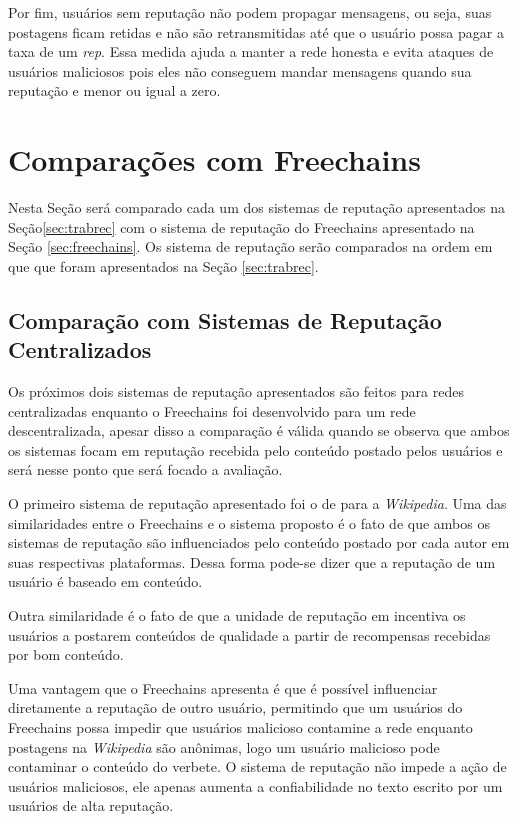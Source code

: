 \documentclass[12pt]{article}
\newcommand{\FC} {Freechains\xspace}
\begin{document}
Por fim, usuários sem reputação não podem propagar mensagens, ou seja, suas postagens ficam retidas e não são retransmitidas até que o usuário possa pagar a taxa de um \emph{rep}. Essa medida ajuda a manter a rede honesta e evita ataques de usuários maliciosos pois eles não conseguem mandar mensagens quando sua reputação e menor ou igual a zero.

\section{Comparações com \FC} \label{sec:comparacao}

Nesta Seção será comparado cada um dos sistemas de reputação apresentados na Seção\ref{sec:trabrec} com o sistema de reputação do \FC apresentado na Seção \ref{sec:freechains}. Os sistema de reputação serão comparados na ordem em que que foram apresentados na Seção \ref{sec:trabrec}.

\subsection{Comparação com Sistemas de Reputação Centralizados} \label{subsec:CompSRC}

Os próximos dois sistemas de reputação apresentados são feitos para redes centralizadas enquanto o \FC foi desenvolvido para um rede descentralizada, apesar disso a comparação é válida quando se observa que ambos os sistemas focam em reputação recebida pelo conteúdo postado pelos usuários e será nesse ponto que será focado a avaliação.

O primeiro sistema de reputação apresentado foi o de \cite{adler2007content} para a \emph{Wikipedia}. Uma das similaridades entre o \FC e o sistema proposto é o fato de que ambos os sistemas de reputação são influenciados pelo conteúdo postado por cada autor em suas respectivas plataformas. Dessa forma pode-se dizer que a reputação de um usuário é baseado em conteúdo.

Outra similaridade é o fato de que a unidade de reputação em \cite{adler2007content} incentiva os usuários a postarem conteúdos de qualidade a partir de recompensas recebidas por bom conteúdo.

Uma vantagem que o \FC apresenta é que é possível influenciar diretamente a reputação de outro usuário, permitindo que um usuários do \FC possa impedir que usuários malicioso contamine a rede enquanto postagens na \emph{Wikipedia} são anônimas, logo um usuário malicioso pode contaminar o conteúdo do verbete. O sistema de reputação não impede a ação de usuários maliciosos, ele apenas aumenta a confiabilidade no texto escrito por um usuários de alta reputação.
\end{document}

